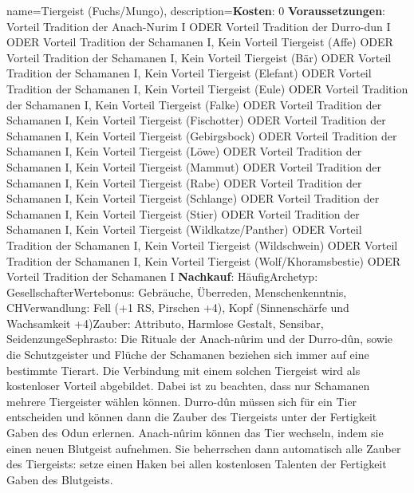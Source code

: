 {
    name={Tiergeist (Fuchs/Mungo)},
    description={\textbf{Kosten}: 0 \textbf{Voraussetzungen}: Vorteil Tradition der Anach-Nurim I ODER Vorteil Tradition der Durro-dun I ODER Vorteil Tradition der Schamanen I, Kein Vorteil Tiergeist (Affe) ODER Vorteil Tradition der Schamanen I, Kein Vorteil Tiergeist (Bär) ODER Vorteil Tradition der Schamanen I, Kein Vorteil Tiergeist (Elefant) ODER Vorteil Tradition der Schamanen I, Kein Vorteil Tiergeist (Eule) ODER Vorteil Tradition der Schamanen I, Kein Vorteil Tiergeist (Falke) ODER Vorteil Tradition der Schamanen I, Kein Vorteil Tiergeist (Fischotter) ODER Vorteil Tradition der Schamanen I, Kein Vorteil Tiergeist (Gebirgsbock) ODER Vorteil Tradition der Schamanen I, Kein Vorteil Tiergeist (Löwe) ODER Vorteil Tradition der Schamanen I, Kein Vorteil Tiergeist (Mammut) ODER Vorteil Tradition der Schamanen I, Kein Vorteil Tiergeist (Rabe) ODER Vorteil Tradition der Schamanen I, Kein Vorteil Tiergeist (Schlange) ODER Vorteil Tradition der Schamanen I, Kein Vorteil Tiergeist (Stier) ODER Vorteil Tradition der Schamanen I, Kein Vorteil Tiergeist (Wildkatze/Panther) ODER Vorteil Tradition der Schamanen I, Kein Vorteil Tiergeist (Wildschwein) ODER Vorteil Tradition der Schamanen I, Kein Vorteil Tiergeist (Wolf/Khoramsbestie) ODER Vorteil Tradition der Schamanen I \textbf{Nachkauf}: Häufig\newline Archetyp: Gesellschafter\newline Wertebonus: Gebräuche, Überreden, Menschenkenntnis, CH\newline Verwandlung: Fell (+1 RS, Pirschen +4), Kopf (Sinnenschärfe und Wachsamkeit +4)\newline Zauber: Attributo, Harmlose Gestalt, Sensibar, Seidenzunge\newline Sephrasto: Die Rituale der Anach-nûrim und der Durro-dûn, sowie die Schutzgeister und Flüche der Schamanen beziehen sich immer auf eine bestimmte Tierart. Die Verbindung mit einem solchen Tiergeist wird als kostenloser Vorteil abgebildet. Dabei ist zu beachten, dass nur Schamanen mehrere Tiergeister wählen können. Durro-dûn müssen sich für ein Tier entscheiden und können dann die Zauber des Tiergeists unter der Fertigkeit Gaben des Odun erlernen. Anach-nûrim können das Tier wechseln, indem sie einen neuen Blutgeist aufnehmen. Sie beherrschen dann automatisch alle Zauber des Tiergeists: setze einen Haken bei allen kostenlosen Talenten der Fertigkeit Gaben des Blutgeists.}
}


